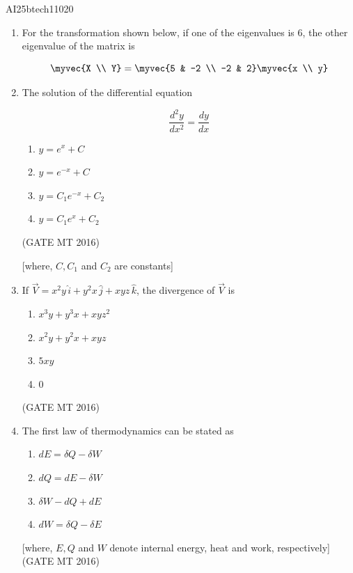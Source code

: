 \documentclass[journal, 11pt, onecolumn]{IEEEtran}
\theoremstyle{remark}
\begin{document}
\begin{center}
    \Large{AI25btech11020}
\end{center} 

\begin{enumerate}

\item For the transformation shown below, if one of the eigenvalues is 6, the other eigenvalue of the matrix is

$$\myvec{X \\ Y} =
\myvec {5 & -2 \\ -2 & 2}
\myvec{x \\ y}$$


\item The solution of the differential equation

$$\frac{d^2 y}{dx^2} = \frac{dy}{dx}$$

\begin{multicols}{2}
\begin{enumerate}
\item $y = e^x + C$
\item $y = e^{-x} + C$
\item $y = C_1 e^{-x} + C_2$
\item $y = C_1 e^x + C_2$
\end{enumerate}   
\end{multicols}
\hfill(GATE MT 2016)

[where, $C, C_1$ and $C_2$ are constants]

\item If $\vec{V} = x^2 y \, \hat{i} + y^2 x \, \hat{j} + xyz \, \hat{k}$, the divergence of $\vec{V}$ is
\begin{enumerate}
\item $x^3 y + y^3 x + xyz^2$
\item $x^2 y + y^2 x + xyz$
\item $5xy$
\item $0$
\end{enumerate}
\hfill(GATE MT 2016)

\item The first law of thermodynamics can be stated as
\begin{enumerate}
\item $dE = \delta Q - \delta W$
\item $dQ = dE - \delta W$
\item $\delta W - dQ + dE$
\item $dW = \delta Q - \delta E$
\end{enumerate}
[where, $E, Q$ and $W$ denote internal energy, heat and work, respectively]
\hfill(GATE MT 2016)


\end{enumerate}
\end{document}

